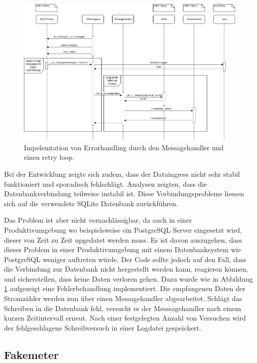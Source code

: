 \begin{figure}[H]
    \centering
    \includegraphics[width=1.0\textwidth]{gfx/dataingress-sequence}
    \caption{
        Impelemtation von Errorhandling durch den Messagehandler und einen
        retry loop.
    }
    \label{fig:dataingress-sequence}
\end{figure}

Bei der Entwicklung zeigte sich zudem, dass der Dataingress nicht sehr stabil
funktioniert und sporadisch fehlschlägt. Analysen zeigten, dass
die Datenbankverbindung teilweise instabil ist.
Diese Verbindungsprobleme liessen sich auf die verwendete SQLite Datenbank zurückführen.

Das Problem ist aber nicht vernachlässigbar, da auch in einer
Produktivumgebung wo beispielsweise ein PostgreSQL Server eingesetzt wird,
dieser von Zeit zu Zeit upgedatet werden muss.
Es ist davon auszugehen, dass dieses Problem in einer Produktivumgebung mit einem Datenbanksystem wie PostgreSQL
weniger auftreten würde.
Der Code sollte jedoch auf den Fall, dass die Verbindung zur Datenbank nicht hergestellt werden kann, reagieren können,
und sicherstellen, dass keine Daten verloren gehen.
Dazu wurde wie in Abbildung \ref{fig:dataingress-sequence} aufgezeigt
eine Fehlerbehandlung implementiert.
Die empfangenen Daten der Stromzähler
werden nun über einen Messagehandler abgearbeitet.
Schlägt das Schreiben in die Datenbank fehl, versucht es der Messsagehandler nach einem kurzen Zeitintervall erneut.
Nach einer festgelegten Anzahl von Versuchen wird der fehlgeschlagene Schreibversuch in einer Logdatei gespeichert.

\subsection{Fakemeter}

